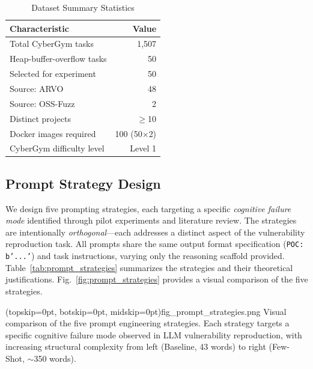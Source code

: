 \documentclass{ieeeaccess}
\begin{document}
\begin{table}[t]
\caption{Dataset Summary Statistics}
\label{tab:dataset_summary}
\centering
\begin{tabular}{lr}
\toprule
\textbf{Characteristic} & \textbf{Value} \\
\midrule
Total CyberGym tasks & 1,507 \\
Heap-buffer-overflow tasks & 50 \\
Selected for experiment & 50 \\
Source: ARVO & 48 \\
Source: OSS-Fuzz & 2 \\
Distinct projects & $\geq$10 \\
Docker images required & 100 (50$\times$2) \\
CyberGym difficulty level & Level 1 \\
\bottomrule
\end{tabular}
\end{table}

\subsection{Prompt Strategy Design}
\label{sec:prompt_design}

We design five prompting strategies, each targeting a specific \emph{cognitive failure mode} identified through pilot experiments and literature review. The strategies are intentionally \emph{orthogonal}---each addresses a distinct aspect of the vulnerability reproduction task. All prompts share the same output format specification (\texttt{POC: b'...'}) and task instructions, varying only the reasoning scaffold provided. Table~\ref{tab:prompt_strategies} summarizes the strategies and their theoretical justifications. Fig.~\ref{fig:prompt_strategies} provides a visual comparison of the five strategies.

\Figure[t!](topskip=0pt, botskip=0pt, midskip=0pt){fig_prompt_strategies.png}
{Visual comparison of the five prompt engineering strategies. Each strategy targets a specific cognitive failure mode observed in LLM vulnerability reproduction, with increasing structural complexity from left (Baseline, 43 words) to right (Few-Shot, $\sim$350 words).\label{fig:prompt_strategies}}
\end{document}
